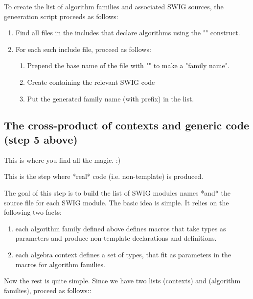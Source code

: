 To create the list of algorithm families and associated SWIG sources,
the geneeration script proceeds as follows:

\begin{enumerate}
\item Find all files in the \Vauc includes that declare algorithms
  using the "" construct.

\item For each such include file, proceed as follows:

  \begin{enumerate}
  \item Prepend the base name of the file with "" to make a
    "family name".

  \item Create  containing the
    relevant SWIG code

  \item Put the generated family name (with prefix) in the 
    list.
  \end{enumerate}
\end{enumerate}

\subsection{The cross-product of contexts and generic code (step 5 above)}

This is where you find all the magic. :)

This is the step where *real* code (i.e. non-template) is produced.

The goal of this step is to build the list of SWIG modules names *and*
the source file for each SWIG module. The basic idea is simple. It
relies on the following two facts:

\begin{enumerate}
\item each algorithm family defined above defines macros that take
  types as parameters and produce non-template declarations and
  definitions.

\item each algebra context defines a set of types, that fit as
  parameters in the macros for algorithm families.
\end{enumerate}

Now the rest is quite simple. Since we have two lists 
(contexts) and  (algorithm families), proceed as follows::

